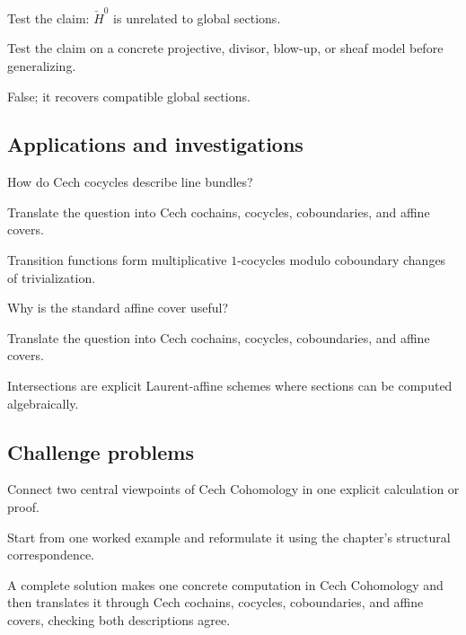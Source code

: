 \begin{exercise}[H0 quotient]\label{exr:vi47-expand-12}
Test the claim: $\check H^0$ is unrelated to global sections.
\end{exercise}
\begin{hint}
Test the claim on a concrete projective, divisor, blow-up, or sheaf model before generalizing.
\end{hint}
\begin{solution}
False; it recovers compatible global sections.
\end{solution}

\subsection*{Applications and investigations}

\begin{exercise}\label{exr:vi47-expand-13}
How do Cech cocycles describe line bundles?
\end{exercise}
\begin{hint}
Translate the question into Cech cochains, cocycles, coboundaries, and affine covers.
\end{hint}
\begin{solution}
Transition functions form multiplicative $1$-cocycles modulo coboundary changes of trivialization.
\end{solution}

\begin{exercise}\label{exr:vi47-expand-14}
Why is the standard affine cover useful?
\end{exercise}
\begin{hint}
Translate the question into Cech cochains, cocycles, coboundaries, and affine covers.
\end{hint}
\begin{solution}
Intersections are explicit Laurent-affine schemes where sections can be computed algebraically.
\end{solution}

\subsection*{Challenge problems}

\begin{exercise}\label{exr:vi47-expand-15}
Connect two central viewpoints of Cech Cohomology in one explicit calculation or proof.
\end{exercise}
\begin{hint}
Start from one worked example and reformulate it using the chapter's structural correspondence.
\end{hint}
\begin{solution}
A complete solution makes one concrete computation in Cech Cohomology and then translates it through Cech cochains, cocycles, coboundaries, and affine covers, checking both descriptions agree.
\end{solution}

